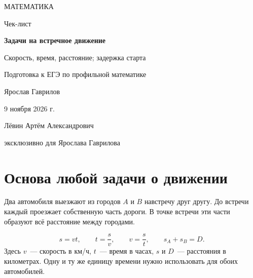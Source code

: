 \documentclass[a4paper,11pt]{article}
\begin{document}
\thispagestyle{empty}
\begin{center}
\vspace*{20mm}
{\large\color{darkaccent}МАТЕМАТИКА\par}
\vspace{13mm}
{\LARGE\color{textgray}Чек-лист\par}
\vspace{12mm}
{\huge\color{accent}\bfseries Задачи на встречное движение\par}
\vspace{5mm}
{\Large\color{darkaccent}Скорость, время, расстояние; задержка старта\par}
\vspace{13mm}
{\large Подготовка к ЕГЭ по профильной математике\par}
\vfill
{\Large Ярослав Гаврилов\par}
\vspace{10mm}
{\large 9 ноября 2026 г.\par}
\vspace{13mm}
{\normalsize Лёвин Артём Александрович\par}
{\normalsize эксклюзивно для Ярослава Гаврилова\par}
\vspace{12mm}
\end{center}
\clearpage

\section{Основа любой задачи о движении}
Два автомобиля выезжают из городов $A$ и $B$ навстречу друг другу. До встречи каждый проезжает собственную часть дороги. В точке встречи эти части образуют всё расстояние между городами.
\begin{center}
\end{center}
\[
\boxed{s=vt},\qquad t=\frac{s}{v},\qquad v=\frac{s}{t},\qquad \boxed{s_A+s_B=D}.
\]
Здесь $v$~--- скорость в км/ч, $t$~--- время в часах, $s$ и $D$~--- расстояния в километрах. Одну и ту же единицу времени нужно использовать для обоих автомобилей.
\end{document}
